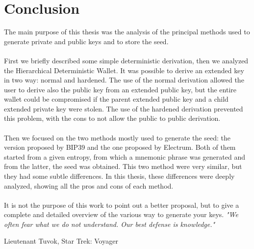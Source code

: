 
\chapter*{Conclusion} %
\label{Conclusion} %


The main purpose of this thesis was the analysis of the principal methods used to generate private and public keys and to store the seed. 
\\ \\
First we briefly described some simple deterministic derivation, then we analyzed the Hierarchical Deterministic Wallet. It was possible to derive an extended key in two way: normal and hardened. The use of the normal derivation allowed the user to derive also the public key from an extended public key, but the entire wallet could be compromised if the parent extended public key and a child extended private key were stolen. The use of the hardened derivation prevented this problem, with the cons to not allow the public to public derivation. 
\\ \\
Then we focused on the two methods mostly used to generate the seed: the version proposed by BIP39 and the one proposed by Electrum. Both of them started from a given entropy, from which a mnemonic phrase was generated and from the latter, the seed was obtained. This two method were very similar, but they had some subtle differences. In this thesis, these differences were deeply analyzed, showing all the pros and cons of each method. 
\\ \\
It is not the purpose of this work to point out a better proposal, but to give a complete and detailed overview of the various way to generate your keys. 
\vfill
\textit{"We often fear what we do not understand. Our best defense is knowledge."}
\begin{flushright}
	Lieutenant Tuvok, Star Trek: Voyager
\end{flushright}

